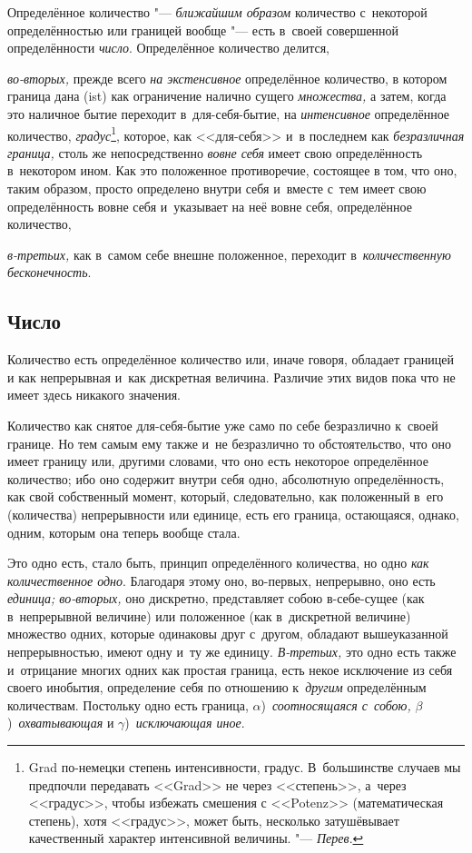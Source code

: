 Определённое количество "--- {\em ближайшим образом} количество с~некоторой
определённостью или границей вообще "--- есть в~своей совершенной
определённости {\em число}. Определённое количество делится,

{\em во-вторых,} прежде всего {\em на экстенсивное} определённое количество,
в котором граница дана (ist) как ограничение налично сущего {\em множества,}
а затем, когда это наличное бытие переходит в~для-себя-бытие, на
{\em интенсивное} определённое количество, {\em градус}\footnote{Grad
по-немецки степень интенсивности, градус. В~большинстве случаев мы предпочли
передавать <<Grad>> не через <<степень>>, а~через <<градус>>, чтобы избежать
смешения с <<Potenz>> (математическая степень), хотя <<градус>>, может быть,
несколько затушёвывает качественный характер интенсивной величины. "---
{\em Перев}.}, которое, как <<для-себя>> и~в последнем как {\em безразличная
граница,} столь же непосредственно {\em вовне себя} имеет свою
определённость в~некотором ином. Как это положенное противоречие, состоящее
в том, что оно, таким образом, просто определено внутри себя и~вместе с~тем
имеет свою определённость вовне себя и~указывает на неё вовне себя, определённое
количество,

{\em в-третьих,} как в~самом себе внешне положенное, переходит
в~{\em количественную бесконечность}.

\subsection{Число}

Количество есть определённое количество или, иначе говоря, обладает границей
и как непрерывная и~как дискретная величина. Различие этих видов пока что
не имеет здесь никакого значения.

Количество как снятое для-себя-бытие уже само по себе безразлично к~своей
границе. Но тем самым ему также и~не безразлично то обстоятельство, что оно
имеет границу или, другими словами, что оно есть некоторое определённое
количество; ибо оно содержит внутри себя одно, абсолютную определённость,
как свой собственный момент, который, следовательно, как положенный в~его
(количества) непрерывности или единице, есть его граница, остающаяся,
однако, одним, которым она теперь вообще стала.

Это одно есть, стало быть, принцип определённого количества, но одно
{\em как количественное одно}. Благодаря этому оно, во-первых, непрерывно,
оно есть {\em единица; во-вторых,} оно дискретно, представляет собою
в-себе-сущее (как в~непрерывной величине) или положенное (как в~дискретной
величине) множество одних, которые одинаковы друг с~другом, обладают
вышеуказанной непрерывностью, имеют одну и~ту же единицу. {\em В-третьих,}
это одно есть также и~отрицание многих одних как простая граница, есть некое
исключение из себя своего инобытия, определение себя по отношению
к~{\em другим} определённым количествам. Постольку одно есть граница,
$\alpha$)~{\em соотносящаяся с~собою,} $\beta$)~{\em охватывающая} и
$\gamma$)~{\em исключающая иное}.

